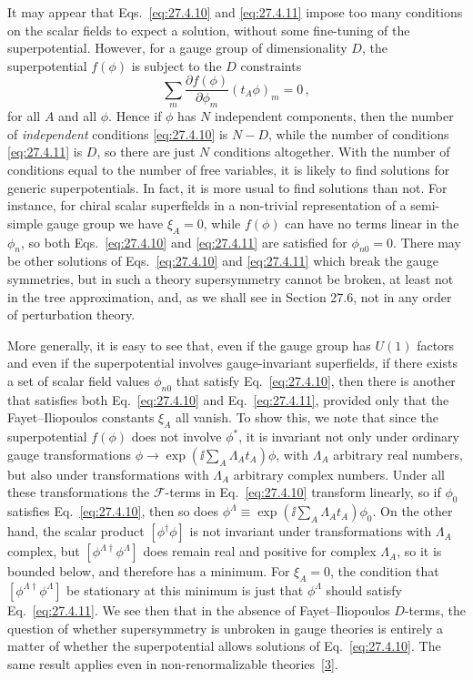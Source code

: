 It may appear that Eqs.~\eqref{eq:27.4.10} and \eqref{eq:27.4.11} impose too
many conditions on the scalar fields to expect a solution, without some
fine-tuning of the superpotential. However, for a gauge group of
dimensionality \(D\), the superpotential \(f(\phi)\) is subject to the \(D\)
constraints
\begin{equation}
  \sum_m\frac{\partial f(\phi)}{\partial\phi_m}(t_A\phi)_m=0\,,
  \tag{27.4.12}\label{eq:27.4.12}
\end{equation}
for all \(A\) and all \(\phi\). Hence if \(\phi\) has \(N\) independent
components, then the number of \textit{independent} conditions
\eqref{eq:27.4.10} is \(N-D\), while the number of conditions
\eqref{eq:27.4.11} is \(D\), so there are just \(N\) conditions altogether.
With the number of conditions equal to the number of free variables, it is
likely to find solutions for generic superpotentials. In fact, it is more
usual to find solutions than not. For instance, for chiral scalar superfields
in a non-trivial representation of a semi-simple gauge group we have
\(\xi_A=0\), while \(f(\phi)\) can have no terms linear in the \(\phi_n\),
so both Eqs.~\eqref{eq:27.4.10} and \eqref{eq:27.4.11} are satisfied for
\(\phi_{n0}=0\). There may be other solutions of Eqs.~\eqref{eq:27.4.10} and
\eqref{eq:27.4.11} which break the gauge symmetries, but in such a theory
supersymmetry cannot be broken, at least not in the tree approximation, and,
as we shall see in Section 27.6, not in any order of perturbation theory.

More generally, it is easy to see that, even if the gauge group has \(U(1)\)
factors and even if the superpotential involves gauge-invariant superfields,
if there exists a set of scalar field values \(\phi_{n0}\) that satisfy
Eq.~\eqref{eq:27.4.10}, then there is another that satisfies both
Eq.~\eqref{eq:27.4.10} and Eq.~\eqref{eq:27.4.11}, provided only that the
Fayet--Iliopoulos constants \(\xi_A\) all vanish. To show this, we note that
since the superpotential \(f(\phi)\) does not involve \(\phi^*\), it is
invariant not only under ordinary gauge transformations
\(\phi\longrightarrow\exp(\ii\sum_A\Lambda_A t_A)\phi\), with
\(\Lambda_A\) arbitrary real numbers, but also under transformations with
\(\Lambda_A\) arbitrary complex numbers. Under all these transformations the
\(\mathcal{F}\)-terms in Eq.~\eqref{eq:27.4.10} transform linearly, so if
\(\phi_0\) satisfies Eq.~\eqref{eq:27.4.10}, then so does
\(\phi^\Lambda\equiv\exp(\ii\sum_A\Lambda_A t_A)\phi_0\). On the other hand,
the scalar product \([\phi^\dagger\phi]\) is not invariant under
transformations with \(\Lambda_A\) complex, but
\([\phi^{\Lambda\dagger}\phi^\Lambda]\) does remain real and positive for
complex \(\Lambda_A\), so it is bounded below, and therefore has a minimum.
For \(\xi_A=0\), the condition that
\([\phi^{\Lambda\dagger}\phi^\Lambda]\) be stationary at this minimum is just
that \(\phi^\Lambda\) should satisfy Eq.~\eqref{eq:27.4.11}. We see then that
in the absence of Fayet--Iliopoulos \(D\)-terms, the question of whether
supersymmetry is unbroken in gauge theories is entirely a matter of whether
the superpotential allows solutions of Eq.~\eqref{eq:27.4.10}. The same
result applies even in non-renormalizable
theories~\hyperref[ch27-ref-3]{[3]}.


